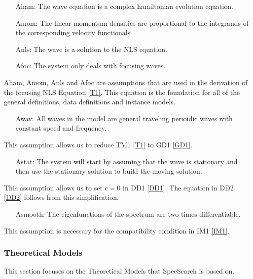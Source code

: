 \documentclass[12pt]{article}
\begin{document}
\begin{itemize}[leftmargin=.5in]

\item[Aham:]The 
wave equation is a complex hamiltonian evolution equation. 
\item[Amom:]The 
linear momentum densities are proportional to the integrands of the 
corresponding velocity functionals 
\item[Anls:]The 
wave is a solution to the NLS equation.
\item[Afoc:]The 
system only deals with focusing waves.
\end{itemize} 
Aham, Amom, Anls and Afoc are assumptions that are used in the derivation of 
the focusing NLS Equation \ref{T1}. This equation is the foundation for all of 
the general definitions, data definitions and instance models. 

\begin{itemize}[leftmargin=.5in]
\item[Awav:]All 
waves in the model are general traveling perioidic waves with constant speed 
and frequency. 
\end{itemize} 

This assumption allows us to reduce TM1 \ref{T1} to GD1 \ref{GD1}.

\begin{itemize}[leftmargin=.5in]
	\item[Astat:] The system will start by assuming that the wave is stationary 
	and 
	then use 
	the stationary solution to build the moving solution.	
\end{itemize} 

This assumption allows us to set $c=0$ in DD1 \ref{DD1}. The equation in DD2 
\ref{DD2} follows from this simplification. 

\begin{itemize}[leftmargin=.5in]
	\item[Asmooth:] The eigenfunctions of the spectrum are two times 
	differentiable.
\end{itemize} 

This assumption is necessary for the compatibility condition in IM1 \ref{IM1}.

\newpage
\subsubsection{Theoretical Models}\label{sec_theoretical}

This section focuses on the Theoretical Models that SpecSearch is based
on. 
~\newline
\end{document}
